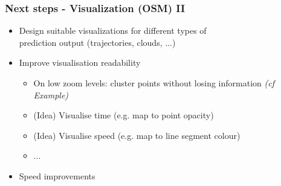 \documentclass[xcolor=dvipsnames]{beamer}
\begin{document}
\begin{frame}
	\frametitle{Next steps - Visualization (OSM) II}
	\begin{itemize} 
		\item Design suitable visualizations for different types of\\ prediction output (trajectories, clouds, ...)
		\item Improve visualisation readability
		\begin{itemize} 
		 	\item On low zoom levels: cluster points without losing information \textit{(cf Example)}
		 	\item (Idea) Visualise time (e.g. map to point opacity)
		 	\item (Idea) Visualise speed (e.g. map to line segment colour)
		 	\item ...
		\end{itemize} 
		\item Speed improvements
	\end{itemize} 
\end{frame}
\end{document}
